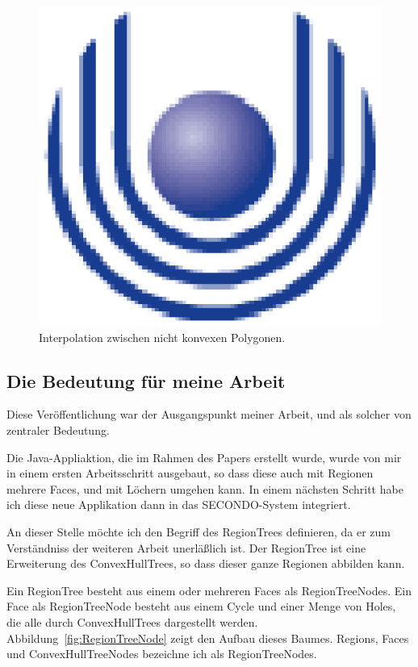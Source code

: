 \begin{figure}
	\centering
	\includegraphics{feu_logo2.eps}
	\caption{Interpolation zwischen nicht konvexen Polygonen.}
	\label{fig:Interpolationnonconvex}
\end{figure}

\subsection{Die Bedeutung für meine Arbeit}

Diese Veröffentlichung war der Ausgangspunkt meiner Arbeit, und als solcher von zentraler Bedeutung.

Die Java-Appliaktion, die im Rahmen des Papers erstellt wurde, wurde von mir in einem ersten Arbeitsschritt ausgebaut, so dass diese auch mit Regionen mehrere Faces, und mit Löchern umgehen kann. In einem nächsten Schritt habe ich diese neue Applikation dann in das SECONDO-System integriert.

An dieser Stelle möchte ich den Begriff des RegionTrees definieren, da er zum Verständniss der weiteren Arbeit unerläßlich ist. Der RegionTree ist eine Erweiterung des ConvexHullTrees, so dass dieser ganze Regionen abbilden kann. 

Ein RegionTree besteht aus einem oder mehreren Faces als RegionTreeNodes. Ein Face als RegionTreeNode besteht aus einem Cycle und einer Menge von Holes, die alle durch ConvexHullTrees dargestellt werden. Abbildung~\ref{fig:RegionTreeNode} zeigt den Aufbau dieses Baumes. Regions, Faces und ConvexHullTreeNodes bezeichne ich als RegionTreeNodes.

